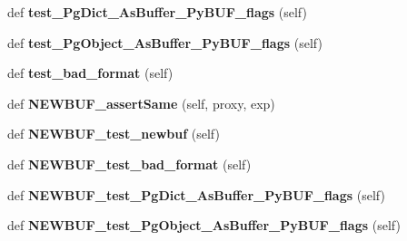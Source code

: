 \begin{DoxyCompactItemize}
def {\bfseries test\+\_\+\+Pg\+Dict\+\_\+\+As\+Buffer\+\_\+\+Py\+B\+U\+F\+\_\+flags} (self)
\item 
\mbox{\label{classpygame_1_1tests_1_1base__test_1_1_base_module_test_aa57adc3e762e8d3a13955aa3378b56aa}} 
def {\bfseries test\+\_\+\+Pg\+Object\+\_\+\+As\+Buffer\+\_\+\+Py\+B\+U\+F\+\_\+flags} (self)
\item 
\mbox{\label{classpygame_1_1tests_1_1base__test_1_1_base_module_test_a293e7683630f7dc8ba836d664ca54ecd}} 
def {\bfseries test\+\_\+bad\+\_\+format} (self)
\item 
\mbox{\label{classpygame_1_1tests_1_1base__test_1_1_base_module_test_a9dd167c51f3ddaaabb894f4ec8400a51}} 
def {\bfseries N\+E\+W\+B\+U\+F\+\_\+assert\+Same} (self, proxy, exp)
\item 
\mbox{\label{classpygame_1_1tests_1_1base__test_1_1_base_module_test_a6613c17a392ffa56ca4982da6a120b8f}} 
def {\bfseries N\+E\+W\+B\+U\+F\+\_\+test\+\_\+newbuf} (self)
\item 
\mbox{\label{classpygame_1_1tests_1_1base__test_1_1_base_module_test_a706f236a8bdd2e71a548ba9b95e5cd44}} 
def {\bfseries N\+E\+W\+B\+U\+F\+\_\+test\+\_\+bad\+\_\+format} (self)
\item 
\mbox{\label{classpygame_1_1tests_1_1base__test_1_1_base_module_test_a9a8e9c25c0b21768b9de7571afd7809c}} 
def {\bfseries N\+E\+W\+B\+U\+F\+\_\+test\+\_\+\+Pg\+Dict\+\_\+\+As\+Buffer\+\_\+\+Py\+B\+U\+F\+\_\+flags} (self)
\item 
\mbox{\label{classpygame_1_1tests_1_1base__test_1_1_base_module_test_aade4f92b71d240c0ae21e9933cab30a1}} 
def {\bfseries N\+E\+W\+B\+U\+F\+\_\+test\+\_\+\+Pg\+Object\+\_\+\+As\+Buffer\+\_\+\+Py\+B\+U\+F\+\_\+flags} (self)
\item 
\mbox{\label{classpygame_1_1tests_1_1base__test_1_1_base_module_test_a2ed444d11440ee83328b7e8c3a48487c}} 

\end{DoxyCompactItemize}
